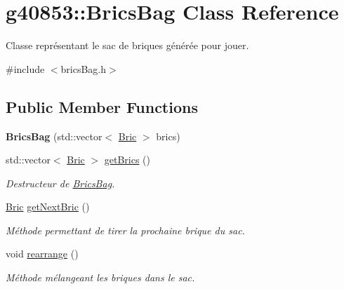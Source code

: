 \hypertarget{classg40853_1_1_brics_bag}{}\section{g40853\+:\+:Brics\+Bag Class Reference}
\label{classg40853_1_1_brics_bag}


Classe représentant le sac de briques générée pour jouer.  




{\ttfamily \#include $<$brics\+Bag.\+h$>$}

\subsection*{Public Member Functions}
\begin{DoxyCompactItemize}
\item 
\hypertarget{classg40853_1_1_brics_bag_a1d2ec5829cb4edb2cd22b89ff40bc093}{}\label{classg40853_1_1_brics_bag_a1d2ec5829cb4edb2cd22b89ff40bc093} 
{\bfseries Brics\+Bag} (std\+::vector$<$ \hyperlink{classg40853_1_1_bric}{Bric} $>$ brics)
\item 
std\+::vector$<$ \hyperlink{classg40853_1_1_bric}{Bric} $>$ \hyperlink{classg40853_1_1_brics_bag_a6c7ba16482e721bfdc2cfe7490a22cc6}{get\+Brics} ()
\begin{DoxyCompactList}\small\item\em Destructeur de \hyperlink{classg40853_1_1_brics_bag}{Brics\+Bag}. \end{DoxyCompactList}\item 
\hyperlink{classg40853_1_1_bric}{Bric} \hyperlink{classg40853_1_1_brics_bag_a32ccd6c47957ea18ab79d7e745e5feab}{get\+Next\+Bric} ()
\begin{DoxyCompactList}\small\item\em Méthode permettant de tirer la prochaine brique du sac. \end{DoxyCompactList}\item 
\hypertarget{classg40853_1_1_brics_bag_a868184986a9cc89c56295dd9befcafe7}{}\label{classg40853_1_1_brics_bag_a868184986a9cc89c56295dd9befcafe7} 
void \hyperlink{classg40853_1_1_brics_bag_a868184986a9cc89c56295dd9befcafe7}{rearrange} ()
\begin{DoxyCompactList}\small\item\em Méthode mélangeant les briques dans le sac. \end{DoxyCompactList}\end{DoxyCompactItemize}


